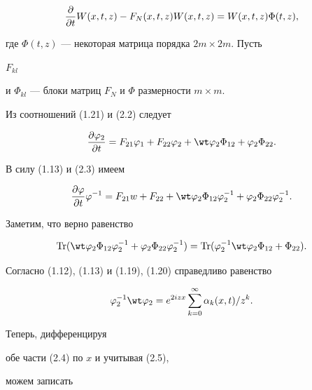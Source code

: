 \begin{equation} 


\myfrac{}{t}W(x,t,z)-F_N(x,t,z)W(x,t,z)=W(x,t,z)\Phi(t,z),


\end{equation} 


где $\Phi(t,z)$ --- некоторая матрица порядка $2m\times 2m$. Пусть 


$F_{kl}$ 


и $\Phi_{kl}$ --- блоки матриц $F_N$ и $\Phi$ размерности $m\times m$. 


Из соотношений (1.21) и (2.2) следует 


\begin{equation} 


\myfrac{\varphi_2}{t}=F_{21}\varphi_1+F_{22}\varphi_2 


+\wt\varphi_2\Phi_{12}+\varphi_2\Phi_{22}. 


\end{equation} 


В силу (1.13) и (2.3) имеем 


\begin{equation} 


\myfrac{\varphi}{t}\varphi^{-1}=F_{21}w+F_{22} 


+\wt\varphi_2\Phi_{12}\varphi^{-1}_2+\varphi_2\Phi_{22} 


\varphi^{-1}_2. 


\end{equation} 


Заметим, что верно равенство 


\begin{equation} 


\Tr(\wt\varphi_2\Phi_{12}\varphi^{-1}_2+ 


\varphi_2\Phi_{22}\varphi^{-1}_2)= 


\Tr(\varphi^{-1}_2\wt\varphi_2\Phi_{12}+\Phi_{22}). 


\end{equation} 


Согласно (1.12), (1.13) и (1.19), (1.20) справедливо равенство 


$$ 


\varphi^{-1}_2\wt\varphi_2=e^{2izx}\sum^\infty_{k=0}\alpha_k 


(x,t)/z^k. 


$$ 


Теперь, дифференцируя 


обе части (2.4) по $x$ и учитывая (2.5), 


можем записать 


